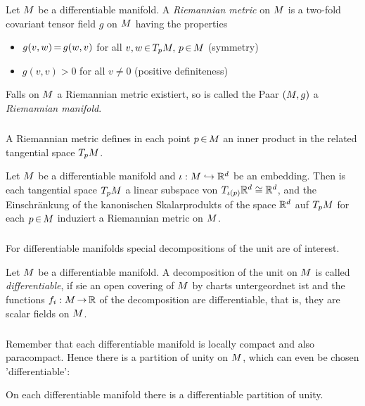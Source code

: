 \documentclass[11pt,twoside]{article}
\begin{document}
\begin{definition}
Let ${M}$ be a differentiable manifold.
A \textit{Riemannian metric} on ${M}$ is
a two-fold covariant tensor field $g$ on ${M}$ having the properties

\begin{itemize}[leftmargin=15pt]
\item[1.]
$g(v,w) {\,=\,} g(w,v)$ for all $v,w {\,\in\,} T_p {M} , \, p {\,\in\,} {M}$ (symmetry)
\item[2.]
$g(v,v) > 0$ for all $v \neq 0$ (positive definiteness)
\end{itemize}

Falls on ${M}$ a Riemannian metric existiert,
so is called the Paar $({M},g)$ a \textit{Riemannian manifold}.
\end{definition}

\subparagraph{}
A Riemannian metric defines in each point $p {\,\in\,} {M}$
an inner product in the related tangential space $T_p {M} $.

\begin{example}
Let ${M}$ be a differentiable manifold and
$\iota:{M} \hookrightarrow {\mathbb{R}}^d$ be an embedding.
Then is each tangential space $T_p {M}$ a linear subspace von
$T_{\iota(p)} {\mathbb{R}}^d \cong {\mathbb{R}}^d$,
and the Einschr\"ankung of the kanonischen Skalarprodukts of the space ${\mathbb{R}}^d$
auf $T_p {M}$ for each $p {\,\in\,} {M}$
induziert a Riemannian metric on ${M}$.
\end{example}

\subparagraph{}
For differentiable manifolds special decompositions
of the unit are of interest.

\begin{definition}
Let ${M}$ be a differentiable manifold.
A decomposition of the unit on ${M}$ is called \textit{differentiable},
if sie an open covering of ${M}$ by charts untergeordnet ist
and the functions $f_i:{M} {\,\to\,} {\mathbb{R}}$ of the decomposition are differentiable,
that is,
they are scalar fields on ${M}$.
\end{definition}

\subparagraph{}
Remember that each differentiable manifold is locally compact
and also paracompact.
Hence there is a partition of unity on ${M}$,
which can even be chosen 'differentiable':

\begin{theorem}
On each differentiable manifold there is a differentiable partition of unity.
\end{theorem}
\end{document}

